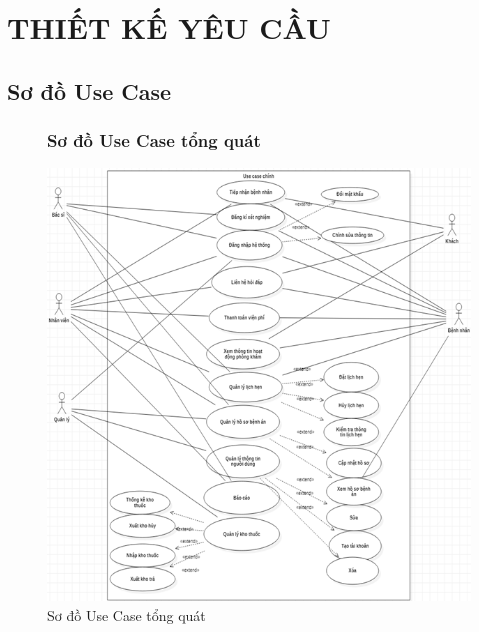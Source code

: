 \documentclass{report}
\begin{document}

\chapter{THIẾT KẾ YÊU CẦU}
\raggedright
\section{Sơ đồ Use Case}
\begin{center}
	\begin{figure}[!htp]
		\subsection{Sơ đồ Use Case tổng quát}
		\begin{center}
			\includegraphics[scale=.8]{Hinh/Sơ đồ use case.png}
		\end{center}
		\caption{Sơ đồ Use Case tổng quát}
	\end{figure}
\end{center}
\end{document}
